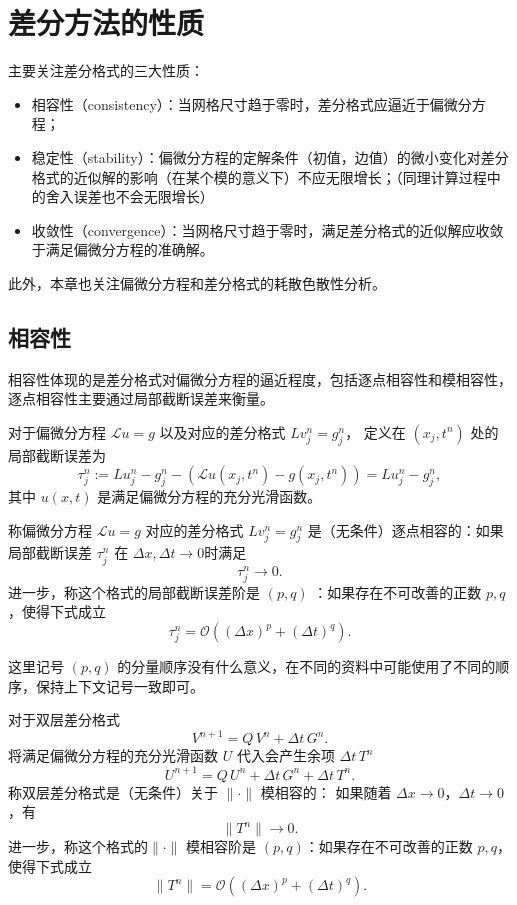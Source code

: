 \chapter{差分方法的性质}

主要关注差分格式的三大性质：
\begin{itemize}
    \item 相容性（consistency）：当网格尺寸趋于零时，差分格式应逼近于偏微分方程；
    \item 稳定性（stability）：偏微分方程的定解条件（初值，边值）的微小变化对差分格式的近似解的影响（在某个模的意义下）不应无限增长；（同理计算过程中的舍入误差也不会无限增长）
    \item 收敛性（convergence）：当网格尺寸趋于零时，满足差分格式的近似解应收敛于满足偏微分方程的准确解。
\end{itemize}
此外，本章也关注偏微分方程和差分格式的耗散色散性分析。

\section{相容性}

相容性体现的是差分格式对偏微分方程的逼近程度，包括逐点相容性和模相容性，逐点相容性主要通过局部截断误差来衡量。

\begin{definition}[局部截断误差]
    对于偏微分方程 $\mathcal{L} u = g$ 以及对应的差分格式 $L v_j^n = g_j^n$，
    定义在 $(x_j,t^n)$ 处的局部截断误差为
    \[
        \tau_j^n := L u_j^n - g_j^n - (\mathcal{L}u(x_j,t^n) - g(x_j,t^n)) = L u_j^n - g_j^n,
    \]
    其中 $u(x,t)$ 是满足偏微分方程的充分光滑函数。
\end{definition}

\begin{definition}[逐点相容性]
    称偏微分方程 $\mathcal{L} u = g$ 对应的差分格式 $L v_j^n = g_j^n$ 是（无条件）逐点相容的：如果局部截断误差 $\tau_j^n$ 在
    $\Delta x,\Delta t\to 0$时满足
    \[
        \tau_j^n \to 0.
    \]
    进一步，称这个格式的局部截断误差阶是 $(p,q)$ ：如果存在不可改善的正数 $p,q$，使得下式成立
    \[
        \tau_j^n = \mathcal{O}((\Delta x)^p + (\Delta t)^q).
    \]
\end{definition}

\begin{remark}
    这里记号 $(p,q)$ 的分量顺序没有什么意义，在不同的资料中可能使用了不同的顺序，保持上下文记号一致即可。
\end{remark}

\begin{definition}[模相容性]\label{def:consistency-norm}
    对于双层差分格式
    \[
        V^{n+1} = Q \, V^{n} + \Delta t\, G^{n}.
    \]
    将满足偏微分方程的充分光滑函数 $U$ 代入会产生余项 $\Delta t\,T^{n}$
    \[
        U^{n+1} = Q \, U^{n} + \Delta t\, G^{n} + \Delta t\, T^{n}.
    \]
    称双层差分格式是（无条件）关于 $\|\cdot\|$ 模相容的：
    如果随着 $\Delta x \to 0$，$\Delta t \to 0$，有
    \[
        \|T^{n}\|  \to 0.
    \]
    进一步，称这个格式的$\|\cdot\|$ 模相容阶是 $(p,q)$：如果存在不可改善的正数 $p,q$，使得下式成立
    \[
        \|T^{n}\|  = \mathcal{O}((\Delta x)^p + (\Delta t)^q).
    \]
\end{definition}

